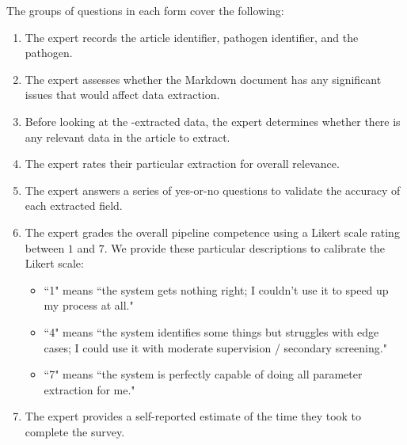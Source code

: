 The groups of questions in each form cover the following:
\begin{enumerate}
    \item The expert records the article identifier, pathogen identifier, and the pathogen.
    \item The expert assesses whether the Markdown document has any significant issues that would affect data extraction.
    \item Before looking at the \name{}-extracted data, the expert determines whether there is any relevant data in the article to extract.
    \item The expert rates their particular extraction for overall relevance.
    \item The expert answers a series of yes-or-no questions to validate the accuracy of each extracted field.
    \item The expert grades the overall pipeline competence using a Likert scale rating between $1$ and $7$. We provide these particular descriptions to calibrate the Likert scale:\begin{itemize}
        \item ``1" means ``the system gets nothing right; I couldn't use it to speed up my process at all."
        \item ``4" means ``the system identifies some things but struggles with edge cases; I could use it with moderate supervision / secondary screening."
        \item ``7" means ``the system is perfectly capable of doing all parameter extraction for me."
    \end{itemize}
    \item The expert provides a self-reported estimate of the time they took to complete the survey.
\end{enumerate}

\clearpage